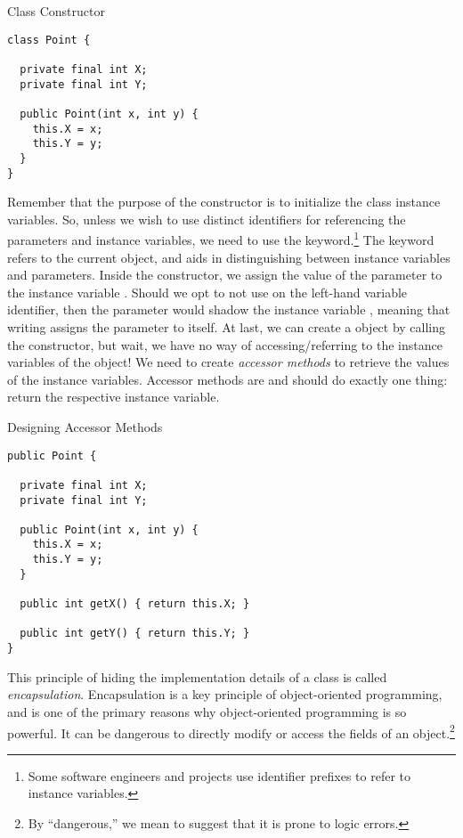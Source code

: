 \begin{cl}[]{ Class Constructor}
\begin{lstlisting}[language=MyJava]
class Point {
  
  private final int X;
  private final int Y;
  
  public Point(int x, int y) {
    this.X = x;
    this.Y = y;
  }
}
\end{lstlisting}
\end{cl}
Remember that the purpose of the constructor is to initialize the class instance variables. So, unless we wish to use distinct identifiers for referencing the parameters and instance variables, we need to use the  keyword.\footnote{Some software engineers and projects use identifier prefixes to refer to instance variables.} The  keyword refers to the current object, and aids in distinguishing between instance variables and parameters. Inside the constructor, we assign the value of the parameter  to the instance variable . Should we opt to not use  on the left-hand variable identifier, then the parameter  would shadow the instance variable , meaning that writing  assigns the parameter to itself. At last, we can create a  object by calling the constructor, but wait, we have no way of accessing/referring to the instance variables of the  object! We need to create \emph{accessor methods} to retrieve the values of the instance variables. Accessor methods are  and should do exactly one thing: return the respective instance variable.

\begin{cl}[]{Designing Accessor Methods}
\begin{lstlisting}[language=MyJava]
public Point {

  private final int X;
  private final int Y;
  
  public Point(int x, int y) {
    this.X = x;
    this.Y = y;
  }
  
  public int getX() { return this.X; }
  
  public int getY() { return this.Y; }
}
\end{lstlisting}
\end{cl}

This principle of hiding the implementation details of a class is called \emph{encapsulation}. Encapsulation is a key principle of object-oriented programming, and is one of the primary reasons why object-oriented programming is so powerful. It can be dangerous to directly modify or access the fields of an object.\footnote{By ``dangerous,'' we mean to suggest that it is prone to logic errors.} 

